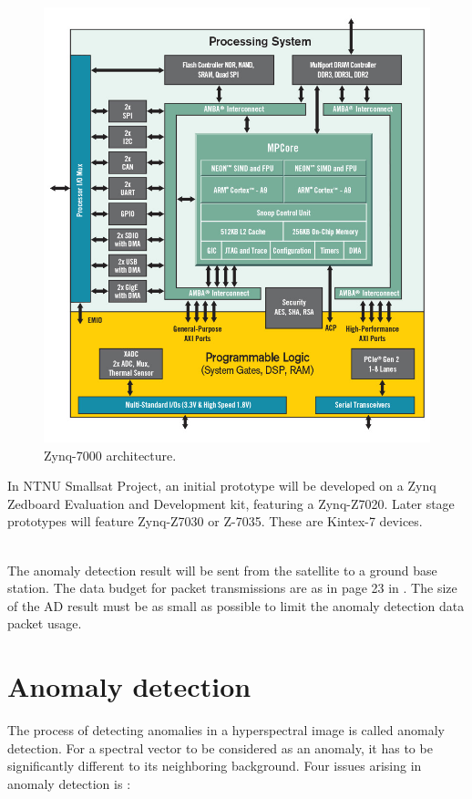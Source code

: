 \begin{figure}[H]
\centering
   \includegraphics[scale=0.3]{images/zynq-mp-core-dual.png}
  \caption{ Zynq-7000 architecture\cite{cite:zynq_7000}. } 
  \label{fig:zynq_7000}
\end{figure}
 In NTNU Smallsat Project, an initial prototype will be developed on a Zynq Zedboard Evaluation and Development kit, featuring a Zynq-Z7020. Later stage prototypes will feature Zynq-Z7030 or Z-7035. These are Kintex-7 devices. 

\\
The anomaly detection result will be sent from the satellite to a ground base station. The data budget for packet transmissions are as in page 23 in \cite{SmallSat_project_description}. The size of the AD result must be as small as possible to limit the anomaly detection data packet usage.  

\section{Anomaly detection}
\label{sec:anomaly_detectors_theory}
The process of detecting anomalies in a hyperspectral image is called anomaly detection. For a spectral vector to be considered as an anomaly, it has to be significantly different to its neighboring background. Four issues arising in anomaly detection is \cite{chang2006characterization}:
\\
 
